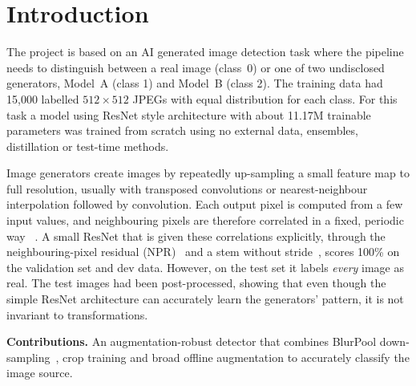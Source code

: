 \section{Introduction}
\label{sec:intro}

The project is based on an AI generated image detection task where the pipeline needs to distinguish between a real image (class~0) or one of two undisclosed generators, Model~A (class 1) and Model~B (class 2). The training data had 15,000 labelled $512\times512$ JPEGs with equal distribution for each class. For this task a model using ResNet style architecture with about 11.17M trainable parameters was trained from scratch using no external data, ensembles, distillation or test-time methods.

Image generators create images by repeatedly up-sampling a small feature map to full resolution, usually with transposed convolutions or nearest-neighbour interpolation followed by convolution. Each output pixel is computed from a few input values, and neighbouring pixels are therefore correlated in a fixed, periodic way ~\cite{odena2016checkerboard,zhang2019spectrum,tan2024npr}. A small ResNet that is given these correlations explicitly, through the neighbouring-pixel residual (NPR)~\cite{tan2024npr} and a stem without stride~\cite{gragnaniello2021critical}, scores 100\% on the validation set and dev data. However, on the test set it labels \emph{every} image as real. The test images had been post-processed, showing that even though the simple ResNet architecture can accurately learn the generators' pattern, it is not invariant to transformations.

\noindent\textbf{Contributions.}
An augmentation-robust detector that combines BlurPool down-sampling~\cite{zhang2019blurpool}, crop training and broad offline augmentation to accurately classify the image source.
